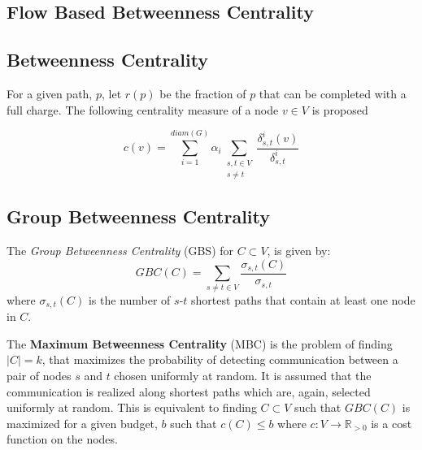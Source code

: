 \documentclass[envcountsame]{llncs}
\begin{document}
    \subsection{Flow Based Betweenness Centrality}
    


    \subsection{Betweenness Centrality}
    For a given path, $p$, let $r(p)$ be the fraction of $p$ that can be completed with a full charge. The following centrality measure of a node $v \in V$ is proposed
    
    \begin{equation}
    c(v) = \sum_{i=1}^{diam(G)} \alpha_i \sum_{\substack{s, t \in V\\s \neq t}} \frac{\delta_{s,t}^i(v)}{\delta_{s,t}^i}
    \end{equation}
	\subsection{Group Betweenness Centrality}
	
	The \emph{Group Betweenness Centrality} (GBS) \citep{everett1999centrality, dolev2009incremental} for $C \subset V$, is given by:
	\begin{equation*}
		GBC(C) = \sum_{s \neq t \in V}\frac{\sigma_{s,t}(C)}{\sigma_{s,t}}
	\end{equation*}
	where $\sigma_{s,t}(C)$ is the number of $s$-$t$ shortest paths that contain at least one node in $C$. 
	
	The \textbf{Maximum Betweenness Centrality} (MBC) is the problem of finding $|C| =k$, that maximizes the probability of detecting communication between a pair of nodes $s$ and $t$ chosen uniformly at random. It is assumed that the communication is realized along shortest paths which
	are, again, selected uniformly at random. This is equivalent to finding $C \subset V$ such that $GBC(C)$ is maximized for a given budget, $b$ such that $c(C) \leq b$ where $c:V \to \mathbb{R}_{>0}$ is a cost function on the nodes.
	
\end{document}
